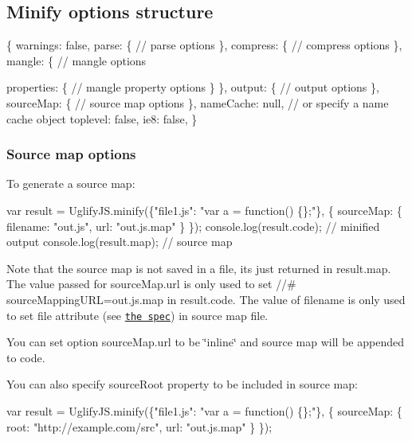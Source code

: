 \subsection*{Minify options structure}


\begin{DoxyCode}
\{
    warnings: false,
    parse: \{
        // parse options
    \},
    compress: \{
        // compress options
    \},
    mangle: \{
        // mangle options

        properties: \{
            // mangle property options
        \}
    \},
    output: \{
        // output options
    \},
    sourceMap: \{
        // source map options
    \},
    nameCache: null, // or specify a name cache object
    toplevel: false,
    ie8: false,
\}
\end{DoxyCode}


\subsubsection*{Source map options}

To generate a source map\+: 
\begin{DoxyCode}
var result = UglifyJS.minify(\{"file1.js": "var a = function() \{\};"\}, \{
    sourceMap: \{
        filename: "out.js",
        url: "out.js.map"
    \}
\});
console.log(result.code); // minified output
console.log(result.map);  // source map
\end{DoxyCode}


Note that the source map is not saved in a file, it\textquotesingle{}s just returned in {\ttfamily result.\+map}. The value passed for {\ttfamily source\+Map.\+url} is only used to set {\ttfamily //\# source\+Mapping\+U\+RL=out.\+js.\+map} in {\ttfamily result.\+code}. The value of {\ttfamily filename} is only used to set {\ttfamily file} attribute (see \href{https://docs.google.com/document/d/1U1RGAehQwRypUTovF1KRlpiOFze0b-_2gc6fAH0KY0k}{\tt the spec}) in source map file.

You can set option {\ttfamily source\+Map.\+url} to be {\ttfamily \char`\"{}inline\char`\"{}} and source map will be appended to code.

You can also specify source\+Root property to be included in source map\+: 
\begin{DoxyCode}
var result = UglifyJS.minify(\{"file1.js": "var a = function() \{\};"\}, \{
    sourceMap: \{
        root: "http://example.com/src",
        url: "out.js.map"
    \}
\});
\end{DoxyCode}


